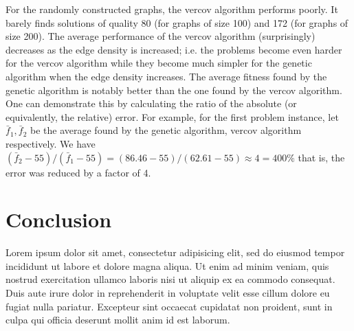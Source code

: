 \documentclass[12pt]{article}
\begin{document}
For the randomly constructed graphs, the vercov algorithm
performs poorly.
It barely finds solutions of quality 80 (for graphs of size 100)
and 172 (for graphs of size 200).
The average performance of the vercov algorithm (surprisingly)
decreases as the edge density is increased;
i.e. the problems become even harder for the vercov algorithm
while they become much simpler for the genetic algorithm when
the edge density increases.
The average fitness found by the genetic algorithm is notably
better than the one found by the vercov algorithm.
One can demonstrate this by calculating
the ratio of the absolute (or equivalently, the relative) error.
For example, for the first problem instance,
let $\bar{f}_1, \bar{f}_2$ be the average found by
the genetic algorithm, vercov algorithm respectively.
We have $ (\bar{f}_2 - 55) / (\bar{f}_1 - 55) = (86.46 - 55)/(62.61 - 55) \approx 4 = 400\%$
that is, the error was reduced by a factor of 4.


\section{Conclusion}
Lorem ipsum dolor sit amet, consectetur adipisicing elit, sed do eiusmod
tempor incididunt ut labore et dolore magna aliqua. Ut enim ad minim veniam,
quis nostrud exercitation ullamco laboris nisi ut aliquip ex ea commodo
consequat. Duis aute irure dolor in reprehenderit in voluptate velit esse
cillum dolore eu fugiat nulla pariatur. Excepteur sint occaecat cupidatat non
proident, sunt in culpa qui officia deserunt mollit anim id est laborum.


\pagebreak


\cleardoublepage{}
%
%
\printbibliography

\end{document}
